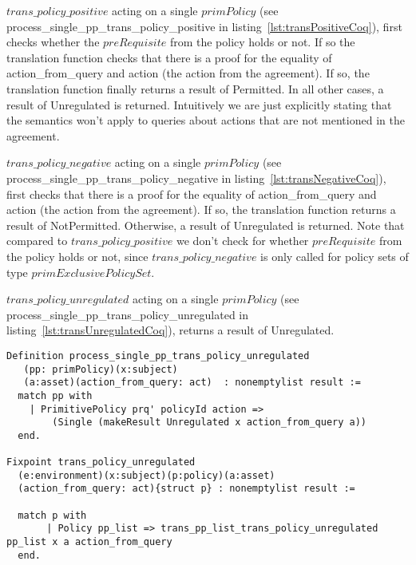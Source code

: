 $trans\_policy\_positive$ acting on a single $primPolicy$ (see process_single_pp_trans_policy_positive in listing~\ref{lst:transPositiveCoq}), first checks whether the $preRequisite$ from the policy holds or not. If so the translation function checks that there is a proof for the equality of action_from_query and action (the action from the agreement). If so, the translation function finally returns a result of Permitted. In all other cases, a result of Unregulated is returned. Intuitively we are just explicitly stating that the semantics won't apply to queries about actions that are not mentioned in the agreement.

$trans\_policy\_negative$ acting on a single $primPolicy$ (see process_single_pp_trans_policy_negative in listing~\ref{lst:transNegativeCoq}), first checks that there is a proof for the equality of action_from_query and action (the action from the agreement). If so, the translation function returns a result of NotPermitted. Otherwise, a result of Unregulated is returned. Note that compared to $trans\_policy\_positive$ we don't check for whether $preRequisite$ from the policy holds or not, since $trans\_policy\_negative$ is only called for policy sets of type $primExclusivePolicySet$.

$trans\_policy\_unregulated$ acting on a single $primPolicy$ (see process_single_pp_trans_policy_unregulated in listing~\ref{lst:transUnregulatedCoq}), returns a result of Unregulated.

\begin{lstlisting}
Definition process_single_pp_trans_policy_unregulated
   (pp: primPolicy)(x:subject)
   (a:asset)(action_from_query: act)  : nonemptylist result :=
  match pp with
    | PrimitivePolicy prq' policyId action =>
        (Single (makeResult Unregulated x action_from_query a))
  end.

Fixpoint trans_policy_unregulated
  (e:environment)(x:subject)(p:policy)(a:asset)
  (action_from_query: act){struct p} : nonemptylist result :=

  match p with
       | Policy pp_list => trans_pp_list_trans_policy_unregulated pp_list x a action_from_query
  end.

\end{lstlisting}

